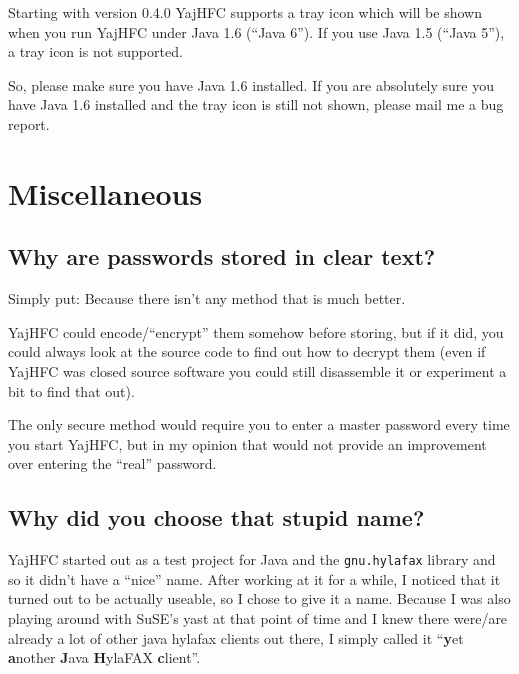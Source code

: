 \documentclass[a4paper,10pt]{scrartcl}
\begin{document}
Starting with version 0.4.0 YajHFC supports a tray icon which will be shown when you run YajHFC under Java 1.6 (``Java 6'').
If you use Java 1.5 (``Java 5''), a tray icon is not supported.

So, please make sure you have Java 1.6 installed. If you are absolutely sure you have Java 1.6 installed and the tray icon is still not shown, please mail me a bug report.



\section{Miscellaneous}

\subsection{Why are passwords stored in clear text?}

Simply put: Because there isn't any method that is much better.

YajHFC could encode/``encrypt'' them somehow before storing, but if it did, 
you could always look at the source code to find out how to decrypt them
(even if YajHFC was closed source software you could still disassemble it
or experiment a bit to find that out).

The only secure method would require you to enter a master password every time
you start YajHFC, but in my opinion that would not provide an improvement over
entering the ``real'' password.


\subsection{Why did you choose that stupid name?}

YajHFC started out as a test project for Java and the \texttt{gnu.hylafax} library and so
it didn't have a ``nice'' name. After working at it for a while, I noticed that it turned 
out to be actually useable, so I chose to give it a name.
Because I was also playing around with SuSE's yast at that point of time and I knew there
were/are already a lot of other java hylafax clients out there, I simply called it
``\textbf{y}et \textbf{a}nother \textbf{J}ava \textbf{H}ylaFAX \textbf{c}lient''. 
\end{document}

